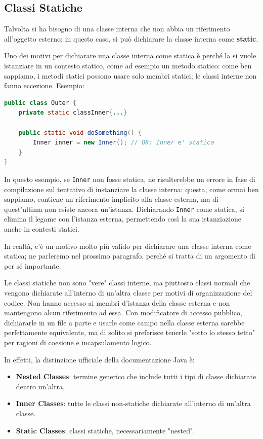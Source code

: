 \subsection{Classi Statiche}
\label{sec: classi statiche}
Talvolta si ha bisogno di una classe interna che non abbia un riferimento all'oggetto esterno; in questo caso, si può dichiarare la classe interna come \textbf{static}.

Uno dei motivi per dichiarare una classe interna come statica è perché la si vuole istanziare in un contesto statico, come ad esempio un metodo statico: come ben sappiamo, i metodi statici possono usare solo membri statici; le classi interne non fanno eccezione. Esempio:

\begin{lstlisting}[language=Java, caption={Esempio di classe interna statica}]
public class Outer {
    private static classInner{...}

    public static void doSomething() {
        Inner inner = new Inner(); // OK: Inner e' statica
    }
}
\end{lstlisting}

In questo esempio, se \texttt{Inner} non fosse statica, ne risulterebbe un errore in fase di compilazione sul tentativo di instanziare la classe interna: questa, come ormai ben sappiamo, contiene un riferimento implicito alla classe esterna, ma di quest'ultima non esiste ancora un'istanza. Dichiarando \texttt{Inner} come statica, si elimina il legame con l'istanza esterna, permettendo così la sua istanziazione anche in contesti statici.

In realtà, c'è un motivo molto più valido per dichiarare una classe interna come statica; ne parleremo nel prossimo paragrafo, perché si tratta di un argomento di per sé importante. 

\begin{observation}
    Le classi statiche non sono "vere" classi interne, ma piuttosto classi normali che vengono dichiarate all'interno di un'altra classe per motivi di organizzazione del codice. Non hanno accesso ai membri d'istanza della classe esterna e non mantengono alcun riferimento ad essa. Con modificatore di accesso pubblico, dichiararle in un file a parte e usarle come campo nella classe esterna sarebbe perfettamente equivalente, ma di solito si preferisce tenerle "sotto lo stesso tetto" per ragioni di coesione e incapsulamento logico.

    In effetti, la distinzione ufficiale della documentazione Java è:
    \begin{itemize}
        \item \textbf{Nested Classes}: termine generico che include tutti i tipi di classe dichiarate dentro un'altra. 
        \item \textbf{Inner Classes}: tutte le classi non-statiche dichiarate all'interno di un'altra classe.
        \item \textbf{Static Classes}: classi statiche, necessariamente "nested".
    \end{itemize}
\end{observation}


